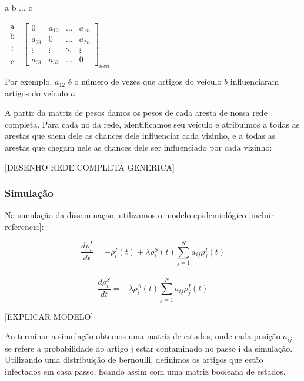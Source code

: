 \documentclass[a4paper,12pt]{article}
\begin{document}
 \begin{center}
 \hspace{0.2cm}a \hspace{0.5cm} b \hspace{0.3cm} $\hdots$ \hspace{0.4cm}c
 
 \vspace{0.2cm}
 $
 \begin{tabular}{c}
   a \\
   b \\
   \vdots\\
   c
 \end{tabular}
$
 $
 \begin{bmatrix}
  0 & a_{12} & \hdots & a_{1n}\\
  a_{21} & 0 & \hdots & a_{2n}\\
  \vdots & \vdots & \ddots & \vdots\\
  a_{31} & a_{32} & \hdots & 0
 \end{bmatrix}_{nxn}
$

\end{center}

\vspace{0.4cm}
Por exemplo, $a_{12}$ é o número de vezes que artigos do veículo $b$ influenciaram artigos do veículo $a$.

A partir da matriz de pesos damos os pesos de cada aresta de nossa rede completa. Para cada nó da rede, identificamos seu veículo e atribuimos
a todas as arestas que saem dele as chances dele influenciar cada vizinho, e a todas as arestas que chegam nele as chances dele ser influenciado
por cada vizinho:

[DESENHO REDE COMPLETA GENERICA]

\subsubsection{Simulação}

 Na simulação da disseminação, utilizamos o modelo epidemiológico [incluir referencia]:

   $$\dfrac{d\rho^{I}_{i}}{dt} = -\rho^{I}_{i}(t) + \lambda\rho_{i}^{S}(t) \sum_{j=1}^{N} a_{ij}\rho_{j}^{I}(t)$$\\
   $$\dfrac{d\rho^{S}_{i}}{dt} = - \lambda\rho_{i}^{S}(t) \sum_{j=1}^{N} a_{ij}\rho_{j}^{I}(t)$$

   [EXPLICAR MODELO]
  
  Ao terminar a simulação obtemos uma matriz de estados, onde cada posição $a_{ij}$ se refere a probabilidade do artigo
  j estar contaminado no passo i da simulação. Utilizando uma distribuição de bernoulli, definimos os artigos que estão infectados
  em casa passo, ficando assim com uma matriz booleana de estados.
  
\end{document}
